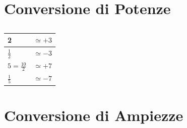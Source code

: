 \documentclass[a4paper,11pt]{report}
\begin{document}
\section{Conversione di Potenze}
\begin{table}[H]
  \caption{}
  \label{tab:}

  \begin{center}
    \begin{tabular}{|l|r|}
    \hline
       2                    & $\simeq +3$ \\
    \hline
       $\frac{1}{2}$        & $\simeq -3$ \\
    \hline
       $5 = \frac{10}{2}$   & $\simeq +7$ \\
    \hline
       $\frac{1}{5}$        & $\simeq -7$ \\
    \hline
    \end{tabular}
  \end{center}
\end{table}
\section{Conversione di Ampiezze}
\end{document}
